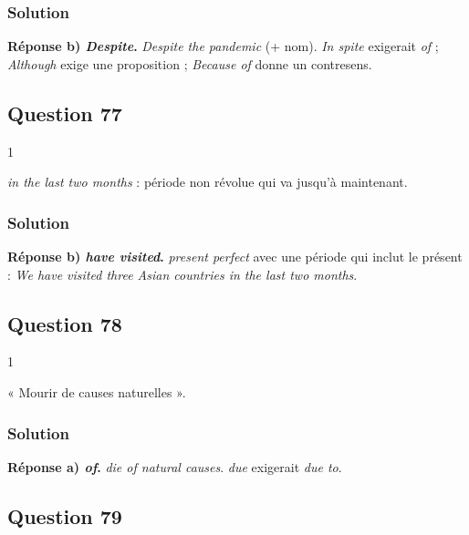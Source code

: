 \documentclass[11pt,a4paper]{article}
\begin{document}
\hypertarget{solution-75}{%
\subsubsection{Solution}\label{solution-75}}

\textbf{Réponse b) \emph{Despite}.} \emph{Despite the pandemic} (+ nom). \emph{In spite} exigerait \emph{of} ; \emph{Although} exige une proposition ; \emph{Because of} donne un contresens.

\hypertarget{question-77}{%
\subsection{Question 77}\label{question-77}}

\begin{indication}{1}

\emph{in the last two months} : période non révolue qui va jusqu'à maintenant.

\end{indication}

\hypertarget{solution-76}{%
\subsubsection{Solution}\label{solution-76}}

\textbf{Réponse b) \emph{have visited}.} \emph{present perfect} avec une période qui inclut le présent : \emph{We have visited three Asian countries in the last two months}.

\hypertarget{question-78}{%
\subsection{Question 78}\label{question-78}}

\begin{indication}{1}

« Mourir de causes naturelles ».

\end{indication}

\hypertarget{solution-77}{%
\subsubsection{Solution}\label{solution-77}}

\textbf{Réponse a) \emph{of}.} \emph{die of natural causes}. \emph{due} exigerait \emph{due to}.

\hypertarget{question-79}{%
\subsection{Question 79}\label{question-79}}
\end{document}
